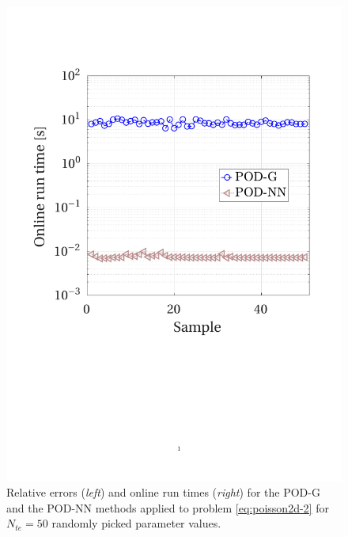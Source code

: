 \documentclass[12pt, a4paper, twoside, openright, notitlepage]{report}
\numberwithin{equation}{chapter}
\theoremstyle{theorem}
\theoremstyle{definition}
\theoremstyle{remark}
\theoremstyle{proposition}
\numberwithin{figure}{chapter}
\begin{document}
\begin{figure}[H]
			\includegraphics[scale = 0.38, trim = {1.5cm 8.25cm 1.5cm 3.5cm}, clip]{poisson2d_2_time}
			
			\vspace*{-0.2cm}
			
			\caption{Relative errors (\emph{left}) and online run times (\emph{right}) for the POD-G and the POD-NN methods applied to problem \eqref{eq:poisson2d-2} for $N_{te} = 50$ randomly picked parameter values.}
			\label{fig:poisson2d-2-fig2}
		
		

\end{figure}
\end{document}
